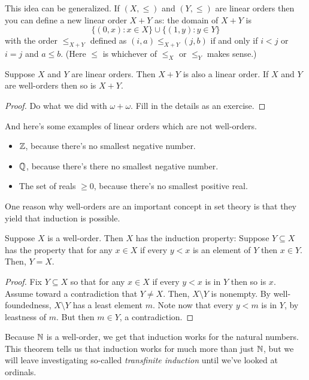 \documentclass[10pt]{amsart}
\begin{document}
This idea can be generalized. If $(X,\le)$ and $(Y,\le)$ are linear orders then you can define a new linear order $X + Y$ as: the domain of $X+Y$ is
\[
\{(0,x) : x \in X \} \cup \{(1,y) : y \in Y\}
\]
with the order $\le_{X+Y}$ defined as $(i,a) \le_{X+Y} (j,b)$ if and only if $i < j$ or $i = j$ and $a \le b$. (Here $\le$ is whichever of $\le_X$ or $\le_Y$ makes sense.)

\begin{proposition}
Suppose $X$ and $Y$ are linear orders. Then $X+Y$ is also a linear order. If $X$ and $Y$ are well-orders then so is $X+Y$.
\end{proposition}

\begin{proof}
Do what we did with $\omega+\omega$. Fill in the details as an exercise.
\end{proof}

And here's some examples of linear orders which are not well-orders.

\begin{itemize}
\item $\mathbb{Z}$, because there's no smallest negative number.
\item $\mathbb{Q}$, because there's there no smallest negative number.
\item The set of reals $\ge 0$, because there's no smallest positive real.
\end{itemize}

One reason why well-orders are an important concept in set theory is that they yield that induction is possible.

\begin{theorem}
Suppose $X$ is a well-order. Then $X$ has the induction property: Suppose $Y \subseteq X$ has the property that for any $x \in X$ if every $y < x$ is an element of $Y$ then $x \in Y$. Then, $Y = X$.
\end{theorem}

\begin{proof}
Fix $Y \subseteq X$ so that for any $x \in X$ if every $y < x$ is in $Y$ then so is $x$. Assume toward a contradiction that $Y \ne X$. Then, $X \setminus Y$ is nonempty. By well-foundedness, $X \setminus Y$ has a least element $m$. Note now that every $y < m$ is in $Y$, by leastness of $m$. But then $m \in Y$, a contradiction.
\end{proof}

Because $\mathbb{N}$ is a well-order, we get that induction works for the natural numbers. This theorem tells us that induction works for much more than just $\mathbb{N}$, but we will leave investigating so-called \emph{transfinite induction} until we've looked at ordinals.
\end{document}
